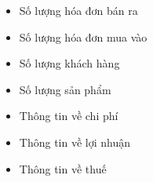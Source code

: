 \begin{itemize}
          \begin{itemize}

              \item Số lượng hóa đơn bán ra

              \item Số lượng hóa đơn mua vào

              \item Số lượng khách hàng

              \item Số lượng sản phẩm

              \item Thông tin về chi phí

              \item Thông tin về lợi nhuận

              \item Thông tin về thuế

          \end{itemize}

\end{itemize}


















